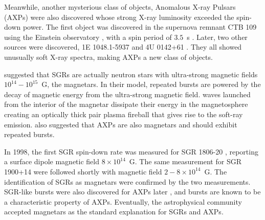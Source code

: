 Meanwhile, another mysterious class of objects, Anomalous X-ray Pulsars (AXPs) were also discovered whose strong X-ray luminosity exceeded the spin-down power.
The first object was discovered in the supernova remnant CTB 109 using the Einstein observatory \citep{1980Natur.287..805G}, with a spin period of $3.5$~s \citep{1981Natur.293..202F}.
Later, two other sources were discovered, 1E 1048.1-5937 \citep{1986ApJ...305..814S} and 4U 0142+61 \citep{1994MNRAS.267..490H,1994ApJ...433L..25I}. They all showed unusually soft X-ray spectra, making AXPs a new class of objects.

\citet{1995MNRAS.275..255T,1996ApJ...473..322T} suggested that SGRs are actually neutron stars with ultra-strong magnetic fields $10^{14}-10^{15}$~G, the magnetars.
In their model, repeated bursts are powered by the decay of magnetic energy from the ultra-strong magnetic field.
\alfven waves launched from the interior of the magnetar dissipate their energy in the magnetosphere creating an optically thick pair plasma fireball that gives rise to the soft-ray emission.
\citet{1996ApJ...473..322T} also suggested that AXPs are also magnetars and should exhibit repeated bursts.

In 1998, the first SGR spin-down rate was measured for SGR 1806-20 \citep{1998Natur.393..235K}, reporting a surface dipole magnetic field $8\times 10^{14}$~G. The same measurement for SGR 1900+14 were followed shortly \citep{1999ApJ...510L.115K} with magnetic field $2-8\times 10^{14}$~G.
The identification of SGRs as magnetars were confirmed by the two measurements.
SGR-like bursts were also discovered for AXPs later \citep{2002Natur.419..142G,2003ApJ...596L..71K}, and bursts are known to be a characteristic property of AXPs.
Eventually, the astrophysical community accepted magnetars as the standard explanation for SGRs and AXPs.

